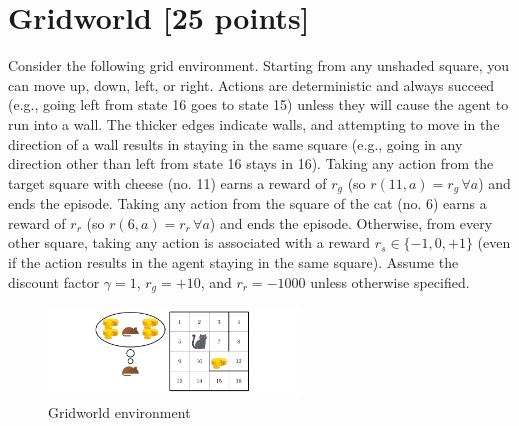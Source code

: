 \documentclass{article}
\begin{document}
\begin{enumerate}[label=(\alph*)]
\end{enumerate}



\clearpage

\section{Gridworld [25 points]}

Consider the following grid environment. Starting from any unshaded square, you can move up, down, left, or right. Actions are deterministic and always succeed (e.g., going left from state 16 goes to state 15) unless they will cause the agent to run into a wall. The thicker edges indicate walls, and attempting to move in the direction of a wall results in staying in the same square (e.g., going in any direction other than left from state 16 stays in 16). Taking any action from the target square with cheese (no. 11) earns a reward of $r_g$ (so $r(11, a) = r_g \, \forall a$) and ends the episode. Taking any action from the square of the cat (no. 6) earns a reward of $r_r$ (so $r(6, a) = r_r \, \forall a$) and ends the episode. Otherwise, from every other square, taking any action is associated with a reward $r_s \in \{-1, 0, +1\}$ (even if the action results in the agent staying in the same square). Assume the discount factor $\gamma = 1$, $r_g = +10$, and $r_r = -1000$ unless otherwise specified.

\begin{figure}[H]
    \centering
    \includegraphics[width=0.6\textwidth]{gridworld.png}
    \caption{Gridworld environment}
    \label{fig:gridworld}
\end{figure}
\end{document}
